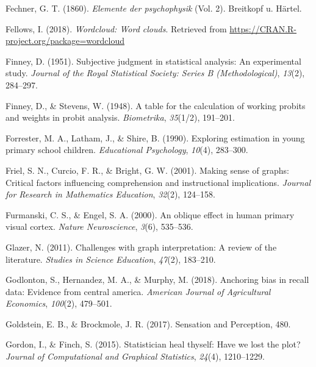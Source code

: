 \documentclass[print]{nuthesis}
\newlength{\cslhangindent}
\newenvironment{CSLReferences}[2]%
{\setlength{\parindent}{0pt}%
\everypar{\setlength{\hangindent}{\cslhangindent}}\ignorespaces}%
{\par}
\begin{document}
\begin{CSLReferences}{1}{0}
\leavevmode{}%
Fechner, G. T. (1860). \emph{Elemente der psychophysik} (Vol. 2). Breitkopf u. H{ä}rtel.

\leavevmode{}%
Fellows, I. (2018). \emph{Wordcloud: Word clouds}. Retrieved from \url{https://CRAN.R-project.org/package=wordcloud}

\leavevmode{}%
Finney, D. (1951). Subjective judgment in statistical analysis: An experimental study. \emph{Journal of the Royal Statistical Society: Series B (Methodological)}, \emph{13}(2), 284--297.

\leavevmode{}%
Finney, D., \& Stevens, W. (1948). A table for the calculation of working probits and weights in probit analysis. \emph{Biometrika}, \emph{35}(1/2), 191--201.

\leavevmode{}%
Forrester, M. A., Latham, J., \& Shire, B. (1990). Exploring estimation in young primary school children. \emph{Educational Psychology}, \emph{10}(4), 283--300.

\leavevmode{}%
Friel, S. N., Curcio, F. R., \& Bright, G. W. (2001). Making sense of graphs: Critical factors influencing comprehension and instructional implications. \emph{Journal for Research in Mathematics Education}, \emph{32}(2), 124--158.

\leavevmode{}%
Furmanski, C. S., \& Engel, S. A. (2000). An oblique effect in human primary visual cortex. \emph{Nature Neuroscience}, \emph{3}(6), 535--536.

\leavevmode{}%
Glazer, N. (2011). Challenges with graph interpretation: A review of the literature. \emph{Studies in Science Education}, \emph{47}(2), 183--210.

\leavevmode{}%
Godlonton, S., Hernandez, M. A., \& Murphy, M. (2018). Anchoring bias in recall data: Evidence from central america. \emph{American Journal of Agricultural Economics}, \emph{100}(2), 479--501.

\leavevmode{}%
Goldstein, E. B., \& Brockmole, J. R. (2017). Sensation and {Perception}, 480.

\leavevmode{}%
Gordon, I., \& Finch, S. (2015). Statistician heal thyself: Have we lost the plot? \emph{Journal of Computational and Graphical Statistics}, \emph{24}(4), 1210--1229.


\end{CSLReferences}
\end{document}
